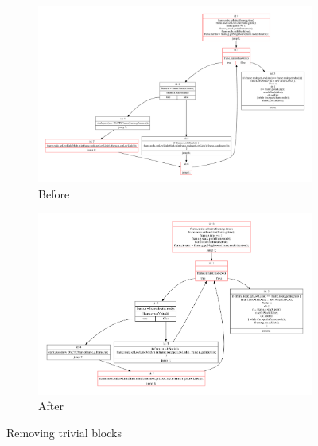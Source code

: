 \begin{figure}[htb]
    \centering
    \begin{subfigure}[b]{\textwidth}
        \centering
        \includegraphics[width=\linewidth]{src/graph/trivial-before.pdf}
        \caption{Before}
    \end{subfigure}
    \begin{subfigure}[b]{\textwidth}
        \centering
        \includegraphics[width=\linewidth]{src/graph/trivial-after.pdf}
        \caption{After \label{img:trivial-after}}
    \end{subfigure}
    \caption{Removing trivial blocks\label{img:remove}}
\end{figure}